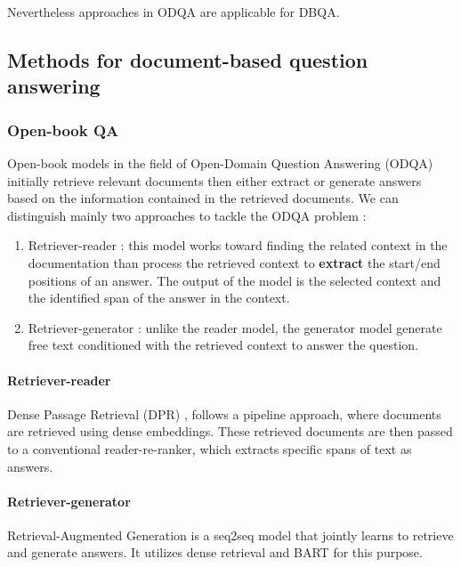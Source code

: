 \documentclass[a4paper,12pt]{article}
\begin{document}
Nevertheless approaches in ODQA are applicable for DBQA.

\subsection{Methods for document-based question answering}
\subsubsection{Open-book QA}
Open-book models in the field of Open-Domain Question Answering (ODQA) initially retrieve relevant documents then either extract or generate answers based on the information contained in the retrieved documents. We can distinguish mainly two approaches to tackle the ODQA problem :

\begin{enumerate}
    \item Retriever-reader : this model works toward finding the related context in the documentation than process the retrieved context to \textbf{extract} the start/end positions of an answer. The output of the model is the selected context and the identified span of the answer in the context. 
    \item Retriever-generator : unlike the reader model, the generator model generate free text conditioned with the retrieved context to answer the question.
\end{enumerate}

\paragraph{Retriever-reader}
Dense Passage Retrieval (DPR) \cite{dpr}, follows a pipeline approach, where documents are retrieved using dense embeddings. These retrieved documents are then passed to a conventional reader-re-ranker, which extracts specific spans of text as answers.

\paragraph{Retriever-generator}
Retrieval-Augmented Generation \cite{rag} is a seq2seq model that jointly learns to retrieve and generate answers. It utilizes dense retrieval and BART \cite{bart} for this purpose.
\end{document}
